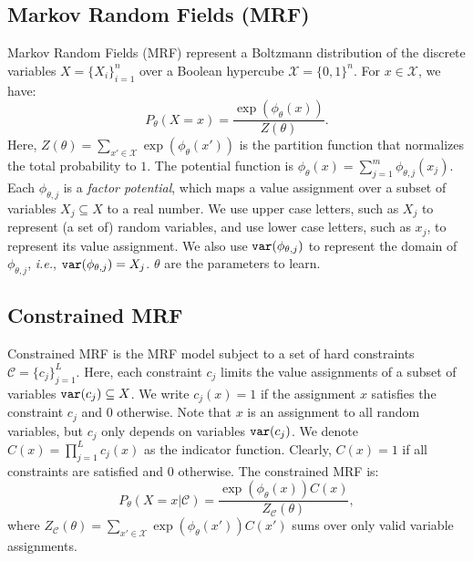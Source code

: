 \subsection{Markov Random Fields (MRF)}Markov Random Fields (MRF) represent a Boltzmann distribution of the discrete
variables $X=\{X_i\}_{i=1}^n$ over a Boolean hypercube $\mathcal{X}=\{0,
    1\}^n$. For $x\in\mathcal{X}$, we have:
\begin{equation} \label{eq:mrf}
    P_{\theta}(X=x)=\frac{\exp \left(\phi_\theta(x)\right)}{Z(\theta)}.%
\end{equation}
Here,
$Z(\theta)=\sum_{x'\in \mathcal{X}} \exp\left(\phi_\theta(x')\right)$ is the partition function that normalizes the total probability to $1$. {The potential function is} $\phi_\theta(x)=\sum_{j=1}^m \phi_{\theta,j}(x_{j})$.
%
Each $\phi_{\theta,j}$ is a \textit{factor potential}, which maps a value
assignment over a subset of variables $X_j \subseteq X$ to a real number.
%
We use upper case letters, such as $X_j$ to represent (a set of) random
variables, and use lower case letters, such as $x_j$, to represent its value
assignment.
%
We also use $\mathtt{var}(\phi_{\theta, j})$ to represent the domain of $\phi_{\theta,
        j}$, \textit{i.e.}, $\mathtt{var}(\phi_{\theta, j}) = X_j$.
%
$\theta$ are the parameters to learn.

\subsection{Constrained MRF} Constrained MRF is the MRF model subject to a set of hard constraints
$\mathcal{C}=\{c_j\}_{j=1}^L$.
%
Here, each constraint $c_j$ limits the value assignments of a subset of
variables $\mathtt{var}(c_j) \subseteq X$.
%
We write $c_j(x) = 1$ if the assignment $x$ satisfies the constraint $c_j$ and
$0$ otherwise. Note that $x$ is an assignment to all random variables, but
$c_j$ only depends on variables $\mathtt{var}(c_j)$.
%
%
We denote $C(x) = \prod_{j=1}^L c_j(x)$ as the indicator function. Clearly,
$C(x) = 1$ if all constraints are satisfied and $0$ otherwise.
%
The constrained MRF is:
\begin{equation} \label{eq:constr_mrf}
    P_{\theta}(X=x|\mathcal{C})=\frac{\exp \left(\phi_\theta(x)\right)C(x)}{Z_\mathcal{C}(\theta)},
\end{equation}
where $Z_\mathcal{C}(\theta)={\sum}_{x'\in \mathcal{X}} \exp\left(\phi_\theta(x')\right) C(x')$ sums over only valid variable assignments.

